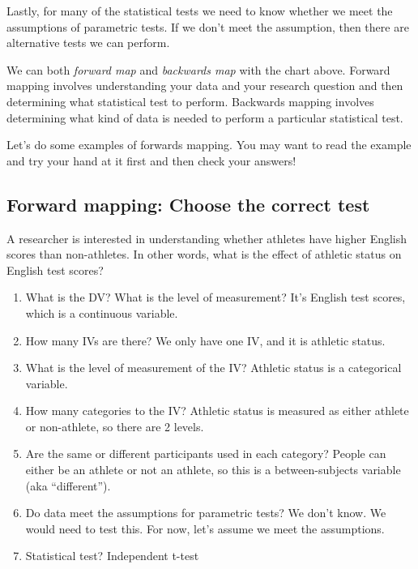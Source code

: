 \documentclass[
]{book}
\begin{document}
Lastly, for many of the statistical tests we need to know whether we meet the assumptions of parametric tests. If we don't meet the assumption, then there are alternative tests we can perform.

We can both \emph{forward map} and \emph{backwards map} with the chart above. Forward mapping involves understanding your data and your research question and then determining what statistical test to perform. Backwards mapping involves determining what kind of data is needed to perform a particular statistical test.

Let's do some examples of forwards mapping. You may want to read the example and try your hand at it first and then check your answers!

\hypertarget{forward-mapping-choose-the-correct-test}{%
\subsection{Forward mapping: Choose the correct test}\label{forward-mapping-choose-the-correct-test}}

A researcher is interested in understanding whether athletes have higher English scores than non-athletes. In other words, what is the effect of athletic status on English test scores?

\begin{enumerate}
\def\labelenumi{\arabic{enumi}.}
\item
  What is the DV? What is the level of measurement? It's English test scores, which is a continuous variable.
\item
  How many IVs are there? We only have one IV, and it is athletic status.
\item
  What is the level of measurement of the IV? Athletic status is a categorical variable.
\item
  How many categories to the IV? Athletic status is measured as either athlete or non-athlete, so there are 2 levels.
\item
  Are the same or different participants used in each category? People can either be an athlete or not an athlete, so this is a between-subjects variable (aka ``different'').
\item
  Do data meet the assumptions for parametric tests? We don't know. We would need to test this. For now, let's assume we meet the assumptions.
\item
  Statistical test? Independent t-test
\end{enumerate}
\end{document}
